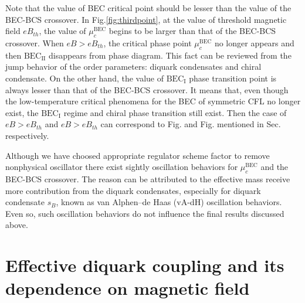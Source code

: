 \documentclass[prd, showpacs,nofootinbib,amsmath,amssymb]{revtex4}
\begin{document}
Note that the  value of   BEC critical point should be lesser than the value of the BEC-BCS crossover. In Fig.\ref{fig:thirdpoint}, at the value of threshold magnetic field $eB_{th}$, the value of  $\mu_c^\text{BEC}$  begins to be larger than that of the BEC-BCS crossover.
When $eB > eB_{th}$, the critical phase point $\mu_c^\text{BEC}$ no longer appears and  then $\text{BEC}_\text{II}$ disappears from phase diagram.
This fact can be reviewed from the jump behavior of the order parameters: diquark condensates and chiral condensate.
On the other hand, the value of $\text{BEC}_\text{I}$ phase transition point is always lesser than that of the BEC-BCS crossover.
It means that, even though the low-temperature critical phenomena for the
BEC of symmetric CFL no longer exist, the $\text{BEC}_\text{I}$
regime and chiral phase transition still exist.
Then the case of  $eB > eB_{th}$ and $eB > eB_{th}$  can correspond to  Fig. and Fig. mentioned in Sec. respectively.

Although we have choosed appropriate regulator scheme factor to remove nonphysical oscillator
there exist sightly  oscillation behaviors for  $\mu_c^\text{BEC}$  and the BEC-BCS crossover.
The reason can be attributed to the effective mass receive more contribution from
the  diquark condensates, especially for diquark condensate $s_B$, known as van Alphen–de Haas (vA-dH)  oscillation behaviors. Even so, such oscillation behaviors do not influence the final results discussed above.



\section{Effective diquark coupling and its dependence on magnetic field}
\end{document}
